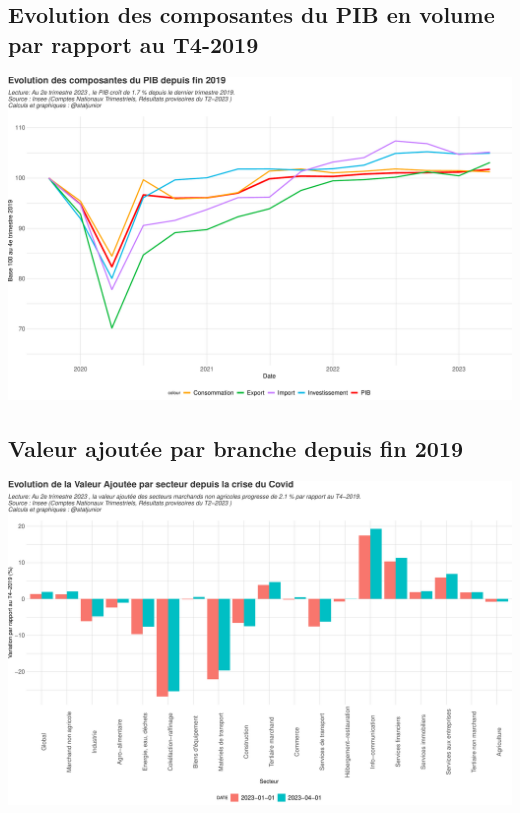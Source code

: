 \documentclass[
  paper=a4,
  ,captions=tableheading
]{scrartcl}
\begin{document}
\hypertarget{evolution-des-composantes-du-pib-en-volume-par-rapport-au-t4-2019}{%
\subsection{Evolution des composantes du PIB en volume par rapport au
T4-2019}\label{evolution-des-composantes-du-pib-en-volume-par-rapport-au-t4-2019}}

\includegraphics{rapport_pdf_compte_branche_files/figure-latex/unnamed-chunk-3-1.pdf}

\hypertarget{valeur-ajoutuxe9e-par-branche-depuis-fin-2019}{%
\subsection{Valeur ajoutée par branche depuis fin
2019}\label{valeur-ajoutuxe9e-par-branche-depuis-fin-2019}}

\includegraphics{rapport_pdf_compte_branche_files/figure-latex/unnamed-chunk-4-1.pdf}
\end{document}
